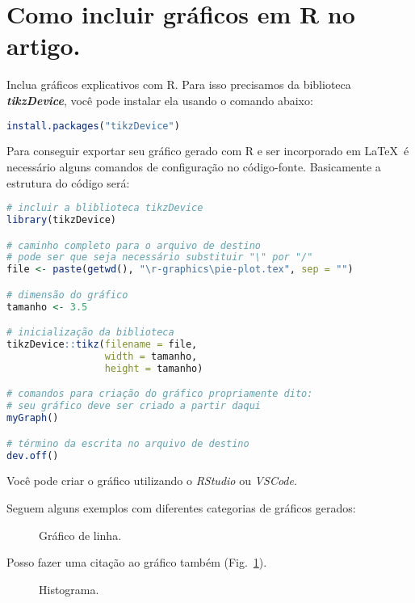 \section{Como incluir gráficos em R no artigo.}

Inclua gráficos explicativos com R. Para isso precisamos da biblioteca \textit{\textbf{tikzDevice}}, você pode instalar ela usando o comando abaixo:

\begin{lstlisting}[language=R]
install.packages("tikzDevice")
\end{lstlisting}

Para conseguir exportar seu gráfico gerado com R e ser incorporado em \LaTeX\ é necessário alguns comandos de configuração no código-fonte. Basicamente a estrutura do código será:

\begin{lstlisting}[language=R]
# incluir a bliblioteca tikzDevice
library(tikzDevice)

# caminho completo para o arquivo de destino
# pode ser que seja necessário substituir "\" por "/"
file <- paste(getwd(), "\r-graphics\pie-plot.tex", sep = "")

# dimensão do gráfico
tamanho <- 3.5

# inicialização da biblioteca 
tikzDevice::tikz(filename = file,
                 width = tamanho,
                 height = tamanho)

# comandos para criação do gráfico propriamente dito:
# seu gráfico deve ser criado a partir daqui
myGraph()

# término da escrita no arquivo de destino
dev.off()
\end{lstlisting}

Você pode criar o gráfico utilizando o \textit{RStudio} ou \textit{VSCode}.

Seguem alguns exemplos com diferentes categorias de gráficos gerados:

\begin{figure}[H]
    \centering
    
    \caption{Gráfico de linha.}
    \label{graph:linha}
\end{figure}

Posso fazer uma citação ao gráfico também (Fig.~\ref{graph:linha}).

\begin{figure}[H]
    \centering
    
    \caption{Histograma.}
    \label{graph:histograma}
\end{figure}


